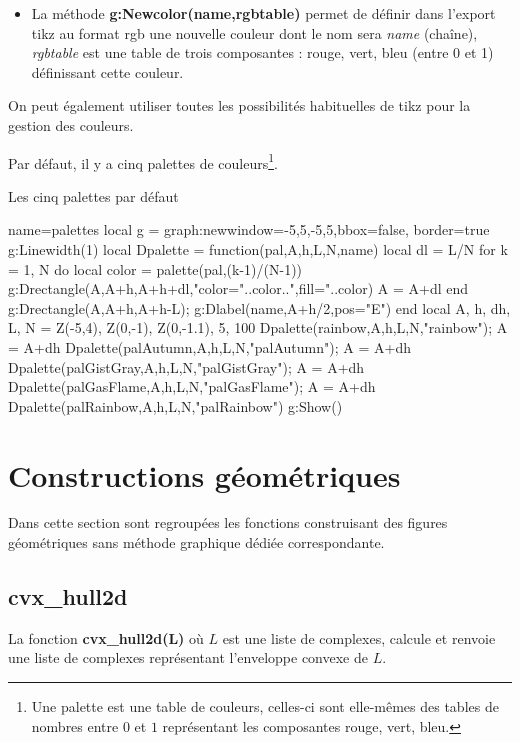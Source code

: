 \begin{itemize}
    \item La méthode \textbf{g:Newcolor(name,rgbtable)} permet de définir dans l'export tikz au format rgb une nouvelle couleur dont le nom sera \emph{name} (chaîne), \emph{rgbtable} est une table de trois composantes : rouge, vert, bleu (entre 0 et 1) définissant cette couleur.
    
\end{itemize}
On peut également utiliser toutes les possibilités habituelles de tikz pour la gestion des couleurs.

Par défaut, il y a cinq palettes de couleurs\footnote{Une palette est une table de couleurs, celles-ci sont elle-mêmes des tables de nombres entre $0$ et $1$ représentant les composantes rouge, vert, bleu.}.

\begin{demo}{Les cinq palettes par défaut}
\begin{luadraw}{name=palettes}
local g = graph:new{window={-5,5,-5,5},bbox=false, border=true}
g:Linewidth(1)
local Dpalette = function(pal,A,h,L,N,name)
    local dl = L/N
    for k = 1, N do
        local color = palette(pal,(k-1)/(N-1))
        g:Drectangle(A,A+h,A+h+dl,"color="..color..",fill="..color)
        A = A+dl
    end
    g:Drectangle(A,A+h,A+h-L); g:Dlabel(name,A+h/2,{pos="E"})
end
local A, h, dh, L, N = Z(-5,4), Z(0,-1), Z(0,-1.1), 5, 100
Dpalette(rainbow,A,h,L,N,"rainbow"); A = A+dh
Dpalette(palAutumn,A,h,L,N,"palAutumn"); A = A+dh
Dpalette(palGistGray,A,h,L,N,"palGistGray"); A = A+dh
Dpalette(palGasFlame,A,h,L,N,"palGasFlame"); A = A+dh
Dpalette(palRainbow,A,h,L,N,"palRainbow")
g:Show()
\end{luadraw}
\end{demo}

\section{Constructions géométriques}

Dans cette section sont regroupées les fonctions construisant des figures géométriques sans méthode graphique dédiée correspondante.

\subsection{cvx\_hull2d}

La fonction \textbf{cvx\_hull2d(L)} où $L$ est une liste de complexes, calcule et renvoie une liste de complexes représentant l'enveloppe convexe de $L$.

